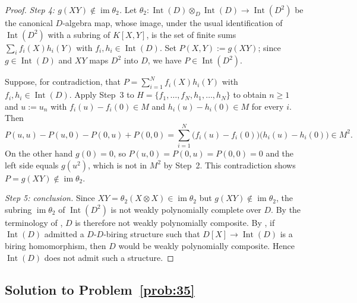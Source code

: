 \documentclass[11pt,reqno]{amsart}
\numberwithin{equation}{section}
\theoremstyle{definition}
\begin{document}
\begin{proof}
\smallskip
\noindent\emph{Step 4: $g(XY)\notin\operatorname{im}\theta_2$.} Let
$\theta_2\colon\operatorname{Int}(D)\otimes_D\operatorname{Int}(D)\to
\operatorname{Int}(D^2)$ be the canonical $D$-algebra map, whose image,
under the usual identification of $\operatorname{Int}(D^2)$ with a subring
of $K[X,Y]$, is the set of finite sums $\sum_i f_i(X)h_i(Y)$ with
$f_i,h_i\in\operatorname{Int}(D)$. Set $P(X,Y):=g(XY)$; since $g\in
\operatorname{Int}(D)$ and $XY$ maps $D^2$ into $D$, we have
$P\in\operatorname{Int}(D^2)$.

Suppose, for contradiction, that $P=\sum_{i=1}^N f_i(X)h_i(Y)$ with
$f_i,h_i\in\operatorname{Int}(D)$. Apply Step~3 to
$H=\{f_1,\dots,f_N,h_1,\dots,h_N\}$ to obtain $n\ge 1$ and $u:=u_n$ with
$f_i(u)-f_i(0)\in M$ and $h_i(u)-h_i(0)\in M$ for every $i$. Then
\[
   P(u,u)-P(u,0)-P(0,u)+P(0,0)
   =\sum_{i=1}^N \bigl(f_i(u)-f_i(0)\bigr)\bigl(h_i(u)-h_i(0)\bigr)\in M^2.
\]
On the other hand $g(0)=0$, so $P(u,0)=P(0,u)=P(0,0)=0$ and the left side
equals $g(u^2)$, which is not in $M^2$ by Step~2. This contradiction shows
$P=g(XY)\notin\operatorname{im}\theta_2$.

\smallskip
\noindent\emph{Step 5: conclusion.} Since $XY=\theta_2(X\otimes X)\in
\operatorname{im}\theta_2$ but $g(XY)\notin\operatorname{im}\theta_2$,
the subring $\operatorname{im}\theta_2$ of $\operatorname{Int}(D^2)$ is
not weakly polynomially complete over $D$. By the terminology of
\cite{Elliott2010-Plethories}, $D$ is therefore not
weakly polynomially composite. By \cite[Theorem~12(1)]{Elliott2010-Plethories}, if $\operatorname{Int}(D)$ admitted a
$D$-$D$-biring structure such that $D[X]\to\operatorname{Int}(D)$ is a
biring homomorphism, then $D$ would be weakly polynomially composite.
Hence $\operatorname{Int}(D)$ does not admit such a structure.
\end{proof}


\subsection{Solution to Problem~\ref{prob:35}}\label{subsec:proof-35}
\end{document}
